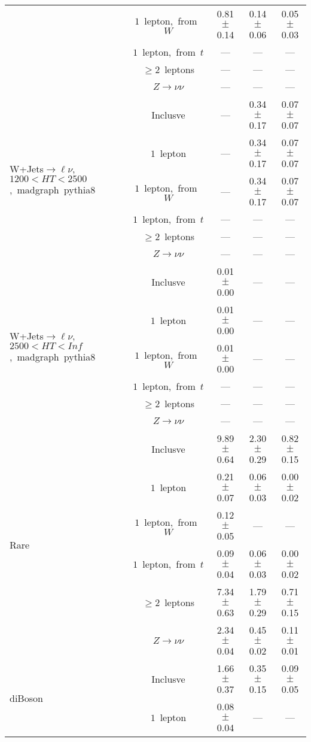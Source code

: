 \documentclass{article}
\begin{document}
\begin{longtable}{|l|c|c|c|c|}
 & $1$~lepton,~from~$W$  & 0.81 $\pm$ 0.14  & 0.14 $\pm$ 0.06  & 0.05 $\pm$ 0.03 \\* 
 & $1$~lepton,~from~$t$  & ---  & ---  & --- \\* 
 & $\ge2$~leptons  & ---  & ---  & --- \\* 
 & $Z\rightarrow\nu\nu$  & ---  & ---  & --- \\* 
\hline 
\multirow{6}{*}{W+Jets$\rightarrow\ell\nu$,~$1200<HT<2500$,~madgraph~pythia8} & Inclusve  & ---  & 0.34 $\pm$ 0.17  & 0.07 $\pm$ 0.07 \\* 
 & $1$~lepton  & ---  & 0.34 $\pm$ 0.17  & 0.07 $\pm$ 0.07 \\* 
 & $1$~lepton,~from~$W$  & ---  & 0.34 $\pm$ 0.17  & 0.07 $\pm$ 0.07 \\* 
 & $1$~lepton,~from~$t$  & ---  & ---  & --- \\* 
 & $\ge2$~leptons  & ---  & ---  & --- \\* 
 & $Z\rightarrow\nu\nu$  & ---  & ---  & --- \\* 
\hline 
\multirow{6}{*}{W+Jets$\rightarrow\ell\nu$,~$2500<HT<Inf$,~madgraph~pythia8} & Inclusve  & 0.01 $\pm$ 0.00  & ---  & --- \\* 
 & $1$~lepton  & 0.01 $\pm$ 0.00  & ---  & --- \\* 
 & $1$~lepton,~from~$W$  & 0.01 $\pm$ 0.00  & ---  & --- \\* 
 & $1$~lepton,~from~$t$  & ---  & ---  & --- \\* 
 & $\ge2$~leptons  & ---  & ---  & --- \\* 
 & $Z\rightarrow\nu\nu$  & ---  & ---  & --- \\* 
\hline 
\multirow{6}{*}{Rare} & Inclusve  & 9.89 $\pm$ 0.64  & 2.30 $\pm$ 0.29  & 0.82 $\pm$ 0.15 \\* 
 & $1$~lepton  & 0.21 $\pm$ 0.07  & 0.06 $\pm$ 0.03  & 0.00 $\pm$ 0.02 \\* 
 & $1$~lepton,~from~$W$  & 0.12 $\pm$ 0.05  & ---  & --- \\* 
 & $1$~lepton,~from~$t$  & 0.09 $\pm$ 0.04  & 0.06 $\pm$ 0.03  & 0.00 $\pm$ 0.02 \\* 
 & $\ge2$~leptons  & 7.34 $\pm$ 0.63  & 1.79 $\pm$ 0.29  & 0.71 $\pm$ 0.15 \\* 
 & $Z\rightarrow\nu\nu$  & 2.34 $\pm$ 0.04  & 0.45 $\pm$ 0.02  & 0.11 $\pm$ 0.01 \\* 
\hline 
\multirow{6}{*}{diBoson} & Inclusve  & 1.66 $\pm$ 0.37  & 0.35 $\pm$ 0.15  & 0.09 $\pm$ 0.05 \\* 
 & $1$~lepton  & 0.08 $\pm$ 0.04  & ---  & --- \\* 

\end{longtable}
\end{document}
